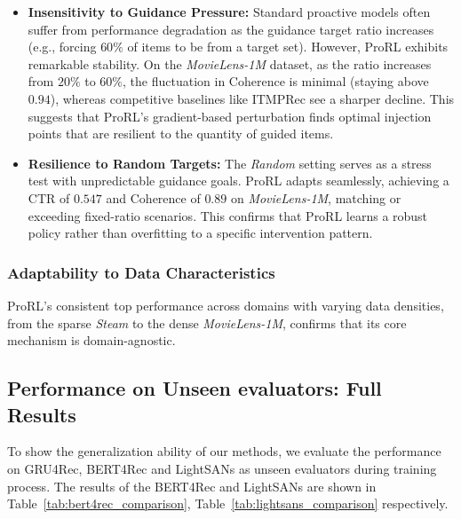 \documentclass{llmxive}
\begin{document}
\begin{itemize}
    \item \textbf{Insensitivity to Guidance Pressure:} 
    Standard proactive models often suffer from performance degradation as the guidance target ratio increases (e.g., forcing $60\%$ of items to be from a target set). However, ProRL exhibits remarkable stability. On the \textit{MovieLens-1M} dataset, as the ratio increases from $20\%$ to $60\%$, the fluctuation in Coherence is minimal (staying above $0.94$), whereas competitive baselines like ITMPRec see a sharper decline. This suggests that ProRL's gradient-based perturbation finds optimal injection points that are resilient to the quantity of guided items.
    
    \item \textbf{Resilience to Random Targets:} 
    The \textit{Random} setting serves as a stress test with unpredictable guidance goals. ProRL adapts seamlessly, achieving a CTR of $0.547$ and Coherence of $0.89$ on \textit{MovieLens-1M}, matching or exceeding fixed-ratio scenarios. This confirms that ProRL learns a robust policy rather than overfitting to a specific intervention pattern.
\end{itemize}

\subsubsection{Adaptability to Data Characteristics}
ProRL's consistent top performance across domains with varying data densities, from the sparse \textit{Steam} to the dense \textit{MovieLens-1M}, confirms that its core mechanism is domain-agnostic.

\subsection{Performance on Unseen evaluators: Full Results}
\label{app:unseen evaluator}

To show the generalization ability of our methods, we evaluate the performance on GRU4Rec, BERT4Rec and LightSANs as unseen evaluators during training process. The results of the BERT4Rec and LightSANs are shown in Table~\ref{tab:bert4rec_comparison}, Table~\ref{tab:lightsans_comparison} respectively.
\end{document}
